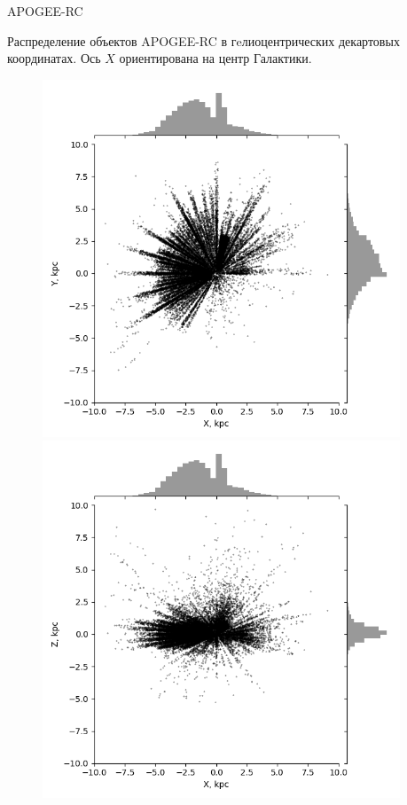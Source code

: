 \documentclass[compress]{beamer}
\begin{document}
\begin{frame}{APOGEE-RC}

Распределение объектов APOGEE-RC в гeлиоцентрических декартовых координатах. Ось $X$ ориентирована на центр Галактики.
\begin{figure}[h!]
\begin{minipage}[h]{0.49\linewidth}
        \includegraphics[width=0.95\textwidth]{../imgs/XYobj.png}
\end{minipage}
\hfill
\begin{minipage}[h]{0.49\linewidth}
        \includegraphics[width=0.95\textwidth]{../imgs/XZobj.png}
\end{minipage}
\end{figure}


\end{frame}
\end{document}
